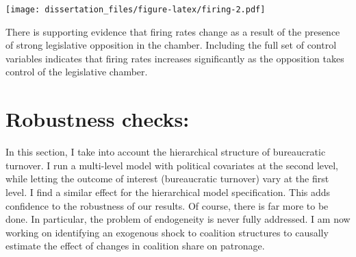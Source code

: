 \documentclass[12pt,]{book}
\begin{document}
\texttt{[image: dissertation\_files/figure-latex/firing-2.pdf]}

There is supporting evidence that firing rates change as a result of the presence of strong legislative opposition in the chamber. Including the full set of control variables indicates that firing rates increases significantly as the opposition takes control of the legislative chamber.

\hypertarget{robustness-checks}{%
\section{Robustness checks:}\label{robustness-checks}}

In this section, I take into account the hierarchical structure of bureaucratic turnover. I run a multi-level model with political covariates at the second level, while letting the outcome of interest (bureaucratic turnover) vary at the first level. I find a similar effect for the hierarchical model specification. This adds confidence to the robustness of our results. Of course, there is far more to be done. In particular, the problem of endogeneity is never fully addressed. I am now working on identifying an exogenous shock to coalition structures to causally estimate the effect of changes in coalition share on patronage.
\end{document}
